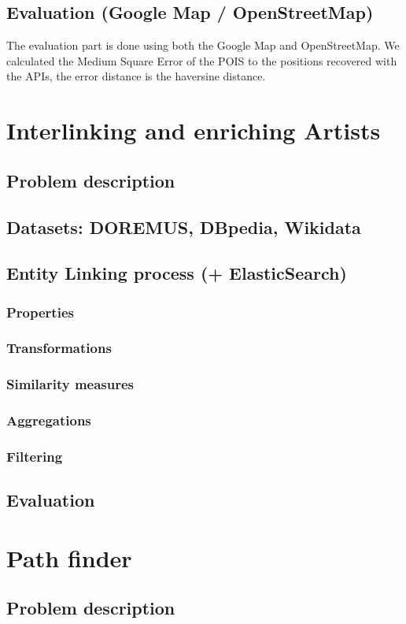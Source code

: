 \subsection{Evaluation (Google Map / OpenStreetMap)}
The evaluation part is done using both the Google Map and OpenStreetMap. We calculated the Medium Square Error of the POIS to the positions recovered with the APIs, the error distance is the haversine distance.
\section{Interlinking and enriching Artists}
\subsection{Problem description}
\subsection{Datasets: DOREMUS, DBpedia, Wikidata}
\subsection{Entity Linking process (+ ElasticSearch)}
\subsubsection{Properties}
\subsubsection{Transformations}
\subsubsection{Similarity measures}
\subsubsection{Aggregations}
\subsubsection{Filtering}
\subsection{Evaluation}
\section{Path finder}
\subsection{Problem description}
